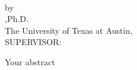 \newpage
\thispagestyle{plain} 
\makeatletter
\begin{center}
\textbf{\large
\@title
}\\
\vspace{1cm}
by\\
\vspace{1cm}
\@author,\space Ph.D. \\
The University of Texas at Austin, \theyear \\
SUPERVISOR: \supervisor
\end{center}
\vspace{1cm} 

\indent
Your abstract
